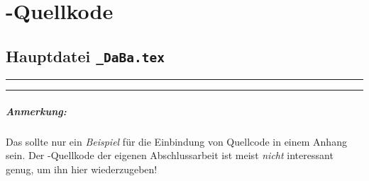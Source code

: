 \chapter{\latex-Quellkode}
\label{app:latex}

\section*{Hauptdatei {\tt\_DaBa.tex}}

\begin{footnotesize}

\end{footnotesize}


\hrule
\hrule

\paragraph{Anmerkung:}
Das sollte nur ein \emph{Beispiel} für die Einbindung von Quellcode
in einem Anhang sein. Der \latex-Quellkode der eigenen
Abschlussarbeit ist meist \emph{nicht} interessant genug, um ihn hier
wiederzugeben!

